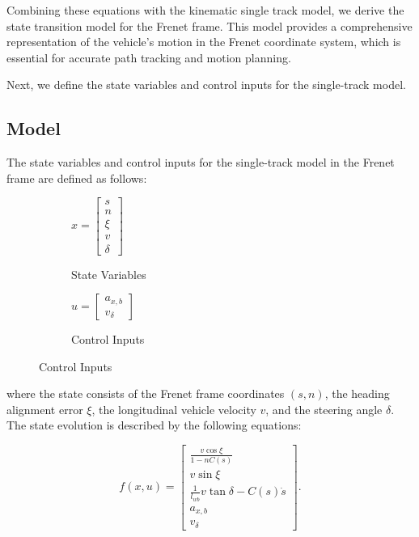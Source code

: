 Combining these equations with the kinematic single track model, we derive the state transition model for the Frenet frame.
This model provides a comprehensive representation of the vehicle's motion in the Frenet coordinate system, which is essential for accurate path
tracking and motion planning.

Next, we define the state variables and control inputs for the single-track model.

\pagebreak

\subsection{Model}

The state variables and control inputs for the single-track model in the Frenet frame are defined as follows:
\begin{figure}[h]
	\centering
	\begin{subfigure}[b]{0.45\textwidth}
		\centering
		$x = \begin{bmatrix}
				s \\ n \\ \xi \\ v \\ \delta
			\end{bmatrix}$
		\caption{State Variables}
	\end{subfigure}
	\hfill
	\begin{subfigure}[b]{0.45\textwidth}
		\centering
		$u = \begin{bmatrix}
				a_{x,b} \\ v_\delta
			\end{bmatrix}$
		\caption{Control Inputs}
	\end{subfigure}
\end{figure}

where the state consists of the Frenet frame coordinates $(s, n)$, the heading alignment error $\xi$, the longitudinal vehicle velocity $v$, and the steering angle $\delta$.
The state evolution is described by the following equations:

\begin{equation}
	f(x, u) =
	\begin{bmatrix}
		\frac{v \cos\xi}{1 - nC(s)}                \\[8pt]
		v \sin\xi                                  \\[8pt]
		\frac{1}{l_{wb}}v \tan\delta - C(s)\dot{s} \\[8pt]
		a_{x,b}                                    \\[8pt]
		v_\delta
	\end{bmatrix}.
\end{equation}

